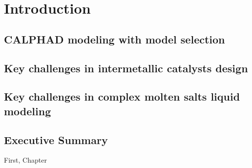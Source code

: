 \chapter{Introduction} \label{sec:Introduction}

\section{CALPHAD modeling with model selection} \label{intro:sec:calphad}


\section{Key challenges in intermetallic catalysts design} \label{intro:sec:catalysts}


\section{Key challenges in complex molten salts liquid modeling } \label{intro:sec:moltensalts}


\section{Executive Summary } \label{intro:sec:summary}

First, Chapter  

